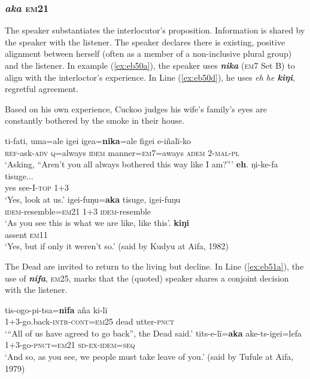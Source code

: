 \documentclass[output=paper]{langsci/langscibook}
\begin{document}
\subsubsection{\textit{aka} \textsc{em}21} The speaker substantiates the interlocutor’s  proposition. Information is shared by the speaker with the listener.  The speaker declares there is existing, positive alignment between herself (often as a member of a non-inclusive plural group) and the listener.  In example (\ref{ex:eb50a}), the speaker uses \textbf{\textit{nika}} (\textsc{em}7 Set B) to align with the interloctor’s experience.
In Line (\ref{ex:eb50d}), he uses \textit{eh he \textbf{kiŋi}}, regretful agreement.

Based on his  own experience, Cuckoo judges his wife’s family’s eyes are constantly bothered by the smoke in their house. 

\begin{exe}
\ex \label{ex:eb50}
	\begin{xlist}
	\ex \label{ex:eb50a}
	\gll ti-fati, uma=ale igei igea=\textbf{nika}=ale figei e-iñalï-ko\\
	\textsc{ref}-ask-\textsc{adv} \textsc{q}=always \textsc{idem} manner=\textsc{em7}=aways \textsc{adem} 2-\textsc{mal-pl}\\
	\trans ‘Asking,  “Aren’t you all always bothered this way like I am?”’
	\ex \label{ex:eb50b}
	\gll \textbf{eh}. ŋi-ke-fa tisuge...\\
	yes see-I-\textsc{top} 1+3\\
	\trans ‘Yes, look at us.’
	\ex \label{ex:eb50c}
	\gll igei-fuŋu=\textbf{aka} tisuge, igei-fuŋu\\
	\textsc{idem}-resemble=\textsc{em21} 1+3 \textsc{idem}-resemble\\
	\trans ‘As you see this is what we are like, like this’.
	\ex \label{ex:eb50d}
	 \textbf{kiŋi}\\
	assent \textsc{em11}\\
	\trans ‘Yes, but if only it weren’t so.’ (said by Kudyu at Aifa, 1982)
\end{xlist}
\end{exe}

The Dead are invited to return to the living but decline. In Line (\ref{ex:eb51a}), the  use of \textbf{\textit{nifa}}, \textsc{em}25, marks that the (quoted) speaker shares a conjoint decision  with the listener.

\begin{exe}
\ex \label{ex:eb51}
	\begin{xlist}
	\ex \label{ex:eb51a}
	\gll tis-ogo-pi-tsa=\textbf{nifa} aña ki-lï\\
	1+3-go.back-\textsc{intr-cont=em25} dead utter-\textsc{pnct}\\
	\trans `“All of us have agreed to go back”, the Dead said.'
	\ex \label{ex:eb51b}
	\gll tits-e-lï=\textbf{aka} ake-ts-igei=lefa\\
	1+3-go-\textsc{pnct=em21} \textsc{sd-ex-idem=seq}\\
	\trans `And so, as you see, we people must take leave of you.’ (said by Tufule at Aifa, 1979)
\end{xlist}
\end{exe}
\end{document}

